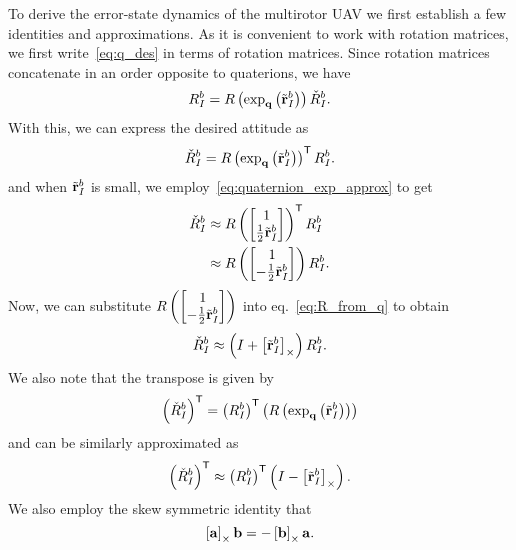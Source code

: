 
To derive the error-state dynamics of the multirotor UAV we first establish a few
identities and approximations. As it is convenient to work with rotation
matrices, we first write~\eqref{eq:q_des} in terms of rotation matrices. Since 
rotation matrices concatenate in an order opposite to quaterions, we have
\begin{equation}
  R_{I}^{b} = R\left(\exp_{\boldsymbol{\mathrm{q}}}\left(\tilde{\boldsymbol{\mathrm{r}}}_{I}^{b}\right)\right)
  \check{R}_{I}^{b}.
\end{equation}
With this, we can express the desired attitude as
\begin{equation}
  \check{R}_{I}^{b} =
  R\left(\exp_{\boldsymbol{\mathrm{q}}}\left(\tilde{\boldsymbol{\mathrm{r}}}_{I}^{b}\right)\right)^{\mathsf{T}} R_{I}^{b}.
\end{equation}
and when $\tilde{\boldsymbol{\mathrm{r}}}_I^b$ is small, we employ~\eqref{eq:quaternion_exp_approx} to get
\begin{align}
  \des{R}_{I}^{b} &\approx R\left(
  \begin{bmatrix}1\\\frac{1}{2}\tilde{\vect{r}}_I^b\end{bmatrix}
\right)^\transpose R_{I}^{b} \\
  \phantom{\des{R}_{I}^{b}} &\approx R\left(
  \begin{bmatrix}1\\-\frac{1}{2}\tilde{\vect{r}}_I^b\end{bmatrix}
\right) R_{I}^{b}.
\end{align}
Now, we can substitute $R\left( \begin{bmatrix}1\\-\frac{1}{2}\tilde{\boldsymbol{\mathrm{r}}}_I^b\end{bmatrix} \right)$ into eq.~\eqref{eq:R_from_q} to obtain
\begin{equation}
  \check{R}_{I}^{b} \approx \left( I + \left[ \tilde{\boldsymbol{\mathrm{r}}}_I^b \right]_{\times} \right)
  R_{I}^{b}.
\end{equation}
We also note that the transpose is given by
\begin{equation}
  \left(\check{R}_{I}^{b}\right)^{\mathsf{T}} =
  \left(R_{I}^{b}\right)^{\mathsf{T}}
  \left(R\left(\exp_{\boldsymbol{\mathrm{q}}}\left(\tilde{\boldsymbol{\mathrm{r}}}_{I}^{b}\right)\right)\right)
\end{equation}
and can be similarly approximated as
\begin{equation}
  \left(\check{R}_{I}^{b}\right)^{\mathsf{T}} \approx
  \left(R_{I}^{b}\right)^{\mathsf{T}} \left( I - \left[ \tilde{\boldsymbol{\mathrm{r}}}_I^b \right]_{\times}
  \right).
\end{equation}
We also employ the skew symmetric identity that
\begin{equation}
  \left[ \boldsymbol{\mathrm{a}} \right]_{\times} \boldsymbol{\mathrm{b}} = -\left[ \boldsymbol{\mathrm{b}} \right]_{\times} \boldsymbol{\mathrm{a}}.
\end{equation}

